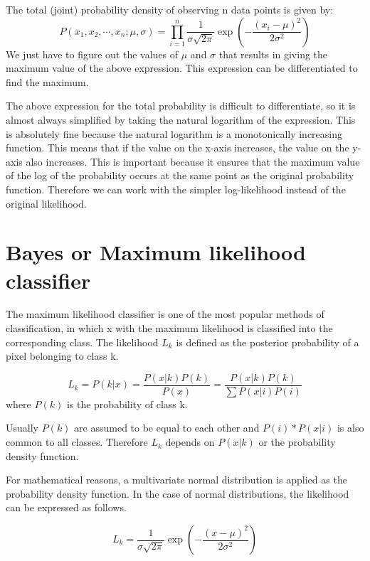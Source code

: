 \documentclass{article}
\begin{document}
The total (joint) probability density of observing n data points is given by:
\[
P(x_1,x_2,\cdots,x_n;\mu,\sigma) = \prod_{i=1}^{n} \frac{1}{\sigma\sqrt{2\pi}} \exp \left( -\frac{(x_i-\mu)^2}{2\sigma^2} \right)
\]
We just have to figure out the values of $\mu$ and $\sigma$ that results in giving the maximum value of the above expression. This expression can be differentiated to find the maximum.

The above expression for the total probability is difficult to differentiate, so it is almost always simplified by taking the natural logarithm of the expression. This is absolutely fine because the natural logarithm is a monotonically increasing function. This means that if the value on the x-axis increases, the value on the y-axis also increases. This is important because it ensures that the maximum value of the log of the probability occurs at the same point as the original probability function. Therefore we can work with the simpler log-likelihood instead of the original likelihood.

\section{Bayes or Maximum likelihood classifier}
The maximum likelihood classifier is one of the most popular methods of classification, in which x with the maximum likelihood is classified into the corresponding class. The likelihood $L_k$ is defined as the posterior probability of a pixel belonging to class k.

\[
L_k = P(k|x) = \frac{P(x|k)P(k)}{P(x)} = \frac{P(x|k)P(k)}{\sum P(x|i)P(i)}
\]
where $P(k)$ is the probability of class k.

Usually $P(k)$ are assumed to be equal to each other and $P(i)*P(x|i)$ is also common to all classes. Therefore $L_k$ depends on $P(x|k)$ or the probability density function.

For mathematical reasons, a multivariate normal distribution is applied as the probability density function. In the case of normal distributions, the likelihood can be expressed as follows.

\[
L_k = \frac{1}{\sigma\sqrt{2\pi}} \exp \left( -\frac{(x-\mu)^2}{2\sigma^2} \right)
\]
\end{document}
